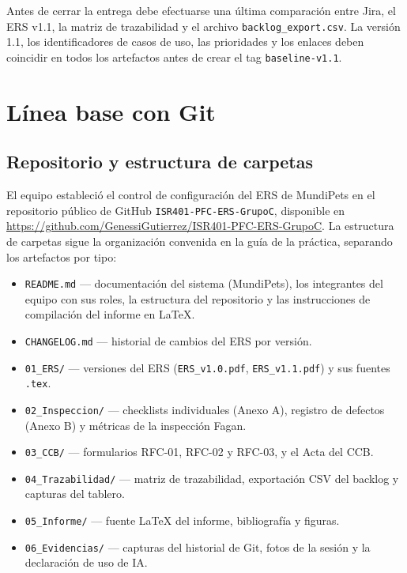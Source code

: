 \documentclass[journal,onecolumn]{IEEEtran}
\begin{document}
	Antes de cerrar la entrega debe efectuarse una última comparación entre Jira, el ERS v1.1, la matriz de trazabilidad y el archivo \texttt{backlog\_export.csv}. La versión 1.1, los identificadores de casos de uso, las prioridades y los enlaces deben coincidir en todos los artefactos antes de crear el tag \texttt{baseline-v1.1}.
	
	\newpage
	
	\section{Línea base con Git}
	\label{sec:baseline-git}
	
	\subsection{Repositorio y estructura de carpetas}
	\label{subsec:8.1}
	
	El equipo estableció el control de configuración del ERS de MundiPets en el repositorio
	público de GitHub \texttt{ISR401-PFC-ERS-GrupoC}, disponible en
	\url{https://github.com/GenessiGutierrez/ISR401-PFC-ERS-GrupoC}. La estructura de
	carpetas sigue la organización convenida en la guía de la práctica, separando los
	artefactos por tipo:
	
	\begin{itemize}
		\item \texttt{README.md} — documentación del sistema (MundiPets), los integrantes
		del equipo con sus roles, la estructura del repositorio y las instrucciones
		de compilación del informe en \LaTeX{}.
		\item \texttt{CHANGELOG.md} — historial de cambios del ERS por versión.
		\item \texttt{01\_ERS/} — versiones del ERS (\texttt{ERS\_v1.0.pdf},
		\texttt{ERS\_v1.1.pdf}) y sus fuentes \texttt{.tex}.
		\item \texttt{02\_Inspeccion/} — checklists individuales (Anexo A), registro de
		defectos (Anexo B) y métricas de la inspección Fagan.
		\item \texttt{03\_CCB/} — formularios RFC-01, RFC-02 y RFC-03, y el Acta del CCB.
		\item \texttt{04\_Trazabilidad/} — matriz de trazabilidad, exportación CSV del
		backlog y capturas del tablero.
		\item \texttt{05\_Informe/} — fuente \LaTeX{} del informe, bibliografía y figuras.
		\item \texttt{06\_Evidencias/} — capturas del historial de Git, fotos de la sesión
		y la declaración de uso de IA.
	\end{itemize}
	
\end{document}
